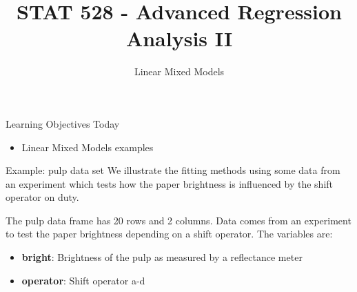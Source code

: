 \documentclass[
  ignorenonframetext,
]{beamer}
\title{STAT 528 - Advanced Regression Analysis II}
\author{Linear Mixed Models}
\date{}
\institute{Daniel J. Eck\\
Department of Statistics\\
University of Illinois}
\providecommand{\tightlist}{%
  \setlength{\itemsep}{0pt}\setlength{\parskip}{0pt}}
\begin{document}
\frame{\titlepage}

\begin{frame}{Learning Objectives Today}
\protect\hypertarget{learning-objectives-today}{}
\begin{itemize}
\tightlist
\item
  Linear Mixed Models examples
\end{itemize}
\end{frame}

\begin{frame}{Example: pulp data set}
\protect\hypertarget{example-pulp-data-set}{}
We illustrate the fitting methods using some data from an experiment
which tests how the paper brightness is influenced by the shift operator
on duty.

The pulp data frame has 20 rows and 2 columns. Data comes from an
experiment to test the paper brightness depending on a shift operator.
The variables are:

\begin{itemize}
\tightlist
\item
  \textbf{bright}: Brightness of the pulp as measured by a reflectance
  meter
\item
  \textbf{operator}: Shift operator a-d
\end{itemize}
\end{frame}
\end{document}
